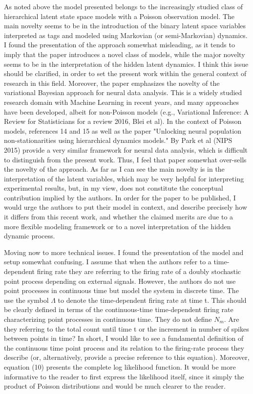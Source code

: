 \documentclass[12pt,a4paper]{article}
\begin{document}
As noted above the model presented belongs to the increasingly studied class of hierarchical latent state space models with a Poisson observation model. The main novelty seems to be in the introduction of the binary latent space variables interpreted as tags and modeled using Markovian (or semi-Markovian) dynamics. I found the presentation of the approach somewhat misleading, as it tends to imply that the paper introduces a novel class of models, while the major novelty seems to be in the interpretation of the hidden latent dynamics. I think this issue should be clarified, in order to set the present work within the general context of research in this field. Moreover, the paper emphasizes the novelty of the variational Bayesian approach for neural data analysis. This is a widely studied research domain with Machine Learning in recent years, and many approaches have been developed, albeit for non-Poisson models (e.g., Variational Inference: A Review for Statisticians for a review 2016, Blei et al). In the context of Poisson models, references 14 and 15 as well as the paper "Unlocking neural population non-stationarities using hierarchical dynamics models." By Park et al (NIPS 2015) provide a very similar framework for neural data analysis, which is difficult to distinguish from the present work. Thus, I feel that paper somewhat over-sells the novelty of the approach. As far as I can see the main novelty is in the interpretation of the latent variables, which may be very helpful for interpreting experimental results, but, in my view, does not constitute the conceptual contribution implied by the authors. In order for the paper to be published, I would urge the authors to put their model in context, and describe precisely how it differs from this recent work, and whether the claimed merits are due to a more flexible modeling framework or to a novel interpretation of the hidden dynamic process.

Moving now to more technical issues. I found the presentation of the model and setup somewhat confusing. I assume that when the authors refer to a time-dependent firing rate they are referring to the firing rate of a doubly stochastic point process depending on external signals. However, the authors do not use point processes in continuous time but model the system in discrete time. The use the symbol $\Lambda$ to denote the time-dependent firing rate at time t. This should be clearly defined in terms of the continuous-time time-dependent firing rate characterizing point processes in continuous time. They do not define $N_m$. Are they referring to the total count until time t or the increment in number of spikes between points in time? In short, I would like to see a fundamental definition of the continuous time point process and its relation to the firing-rate process they describe (or, alternatively, provide a precise reference to this equation). Moreover, equation (10) presents the complete log likelihood function. It would be more informative to the reader to first express the likelihood itself, since it simply the product of Poisson distributions and would be much clearer to the reader.
\end{document}
